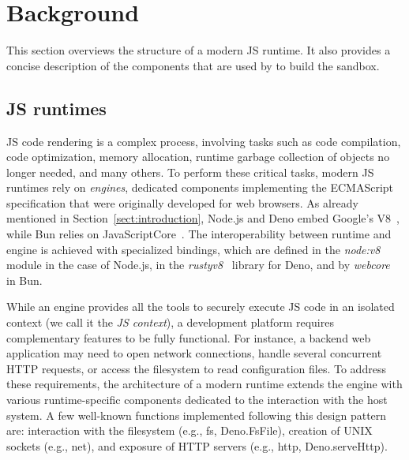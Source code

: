 \section{Background}
\label{sectbackground} 

This section overviews the structure of a modern JS runtime. It also
provides a concise description of the components that are used by \natisand
to build the sandbox.

\vspace{-0.52em}
\subsection{JS runtimes}
\label{sect:background-js-runtime}

JS code rendering is a complex process, involving tasks such as code
compilation, code optimization, memory allocation, runtime garbage
collection of objects no longer needed, and many others. To perform
these critical tasks, modern JS runtimes rely on {\em engines},
dedicated components implementing the ECMAScript specification that
were originally developed for web browsers. As already mentioned in
Section~\ref{sect:introduction}, Node.js and Deno embed Google's
V8~\cite{v8-site}, while Bun relies on
JavaScriptCore~\cite{javascriptcore}. The interoperability between
runtime and engine is achieved with specialized bindings, which are
defined in the {\em node:v8}~\cite{node-v8-bindings} module in the
case of Node.js, in the {\em rusty\textunderscore v8}~\cite{rusty-v8}
library for Deno, and by {\em webcore}~\cite{webcore-bindings} in Bun.

While an engine provides all the tools to securely execute JS code in
an isolated context (we call it the {\em JS context}), a development
platform requires complementary features to be fully functional. For
instance, a backend web application may need to open network
connections, handle several concurrent HTTP requests, or access the
filesystem to read configuration files. To address these requirements,
the architecture of a modern runtime extends the engine with various
runtime-specific components dedicated to the interaction with the host
system. A few well-known functions implemented following this design
pattern are: interaction with the filesystem (e.g., fs, Deno.FsFile),
creation of UNIX sockets (e.g., net), and exposure of HTTP servers
(e.g., http, Deno.serveHttp).

